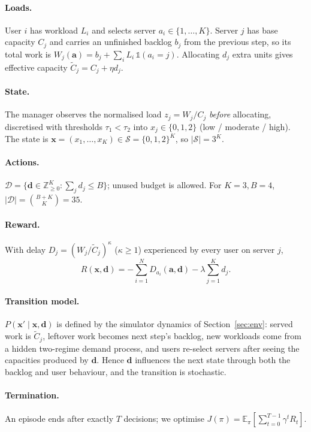 \documentclass{article}
\newcommand{\Ct}{\tilde{C}}
\begin{document}
\paragraph{Loads.} User $i$ has workload $L_i$ and selects server $a_i\in\{1,\dots,K\}$.
Server $j$ has base capacity $C_j$ and carries an unfinished backlog $b_j$ from the
previous step, so its total work is
$W_j(\bm a)=b_j+\sum_{i}L_i\,\mathbb 1(a_i=j)$.
Allocating $d_j$ extra units gives effective capacity $\Ct_j=C_j+\eta d_j$.

\paragraph{State.} The manager observes the normalised load $z_j=W_j/C_j$ \emph{before}
allocating, discretised with thresholds $\tau_1<\tau_2$ into
$x_j\in\{0,1,2\}$ (low / moderate / high). The state is
$\bm x=(x_1,\dots,x_K)\in\mathcal S=\{0,1,2\}^K$, so $|\mathcal S|=3^K$.

\paragraph{Actions.}
$\mathcal D=\{\bm d\in\mathbb Z_{\ge0}^K:\sum_j d_j\le B\}$; unused budget is allowed.
For $K=3,B=4$, $|\mathcal D|=\binom{B+K}{K}=35$.

\paragraph{Reward.} With delay $D_j=(W_j/\Ct_j)^{\kappa}$ ($\kappa\ge1$) experienced by
every user on server $j$,
\begin{equation}
R(\bm x,\bm d)=-\sum_{i=1}^{N}D_{a_i}(\bm a,\bm d)-\lambda\sum_{j=1}^{K}d_j .
\label{eq:reward}
\end{equation}

\paragraph{Transition model.} $P(\bm x'\mid\bm x,\bm d)$ is defined by the simulator
dynamics of Section~\ref{sec:env}: served work is $\Ct_j$, leftover work becomes next
step's backlog, new workloads come from a hidden two-regime demand process, and users
re-select servers after seeing the capacities produced by $\bm d$. Hence $\bm d$
influences the next state through both the backlog and user behaviour, and the
transition is stochastic.

\paragraph{Termination.} An episode ends after exactly $T$ decisions; we
optimise $J(\pi)=\mathbb E_\pi\!\left[\sum_{t=0}^{T-1}\gamma^tR_t\right]$.
\end{document}
